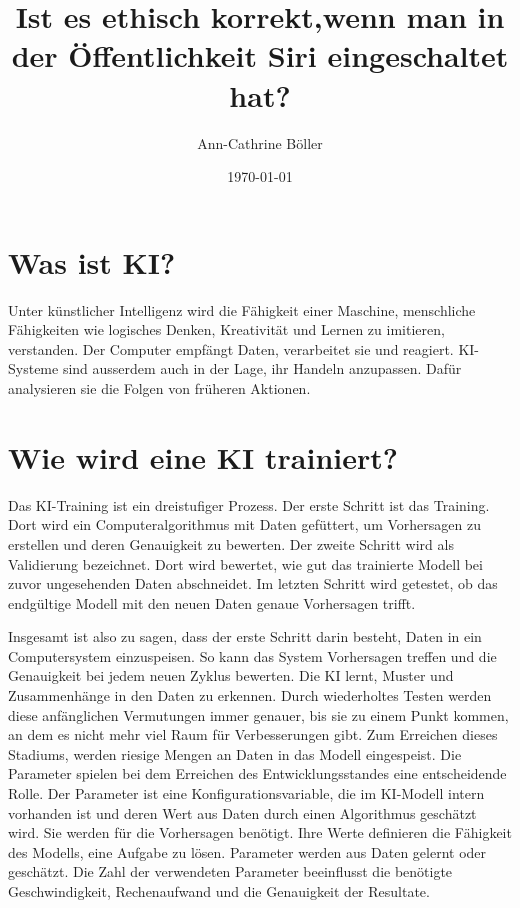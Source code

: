 \documentclass{article}
\title{Ist es ethisch korrekt,wenn man in der Öffentlichkeit Siri eingeschaltet hat?}
\author{Ann-Cathrine Böller}
\date{\today}
\begin{document}
\maketitle


     

\tableofcontents

\section{Was ist KI?}
Unter künstlicher Intelligenz wird die Fähigkeit einer Maschine, menschliche Fähigkeiten wie logisches Denken, Kreativität und Lernen zu imitieren, verstanden.
Der Computer empfängt Daten, verarbeitet sie und reagiert. KI-Systeme sind ausserdem auch in der Lage, ihr Handeln anzupassen. Dafür analysieren sie die Folgen von früheren Aktionen.

\section{Wie wird eine KI trainiert?}
Das KI-Training ist ein dreistufiger Prozess. Der erste Schritt ist das Training. Dort wird ein Computeralgorithmus mit Daten gefüttert, um Vorhersagen zu erstellen und deren Genauigkeit zu bewerten. Der zweite Schritt wird als Validierung bezeichnet. Dort wird bewertet, wie gut das trainierte Modell bei zuvor ungesehenden Daten abschneidet. Im letzten Schritt wird getestet, ob das endgültige Modell mit den neuen Daten genaue Vorhersagen trifft.

Insgesamt ist also zu sagen, dass der erste Schritt darin besteht, Daten in ein Computersystem einzuspeisen. So kann das System Vorhersagen treffen und die Genauigkeit bei jedem neuen Zyklus bewerten. Die KI lernt, Muster und Zusammenhänge in den Daten zu erkennen. Durch wiederholtes Testen werden diese anfänglichen Vermutungen immer genauer, bis sie zu einem Punkt kommen, an dem es nicht mehr viel Raum für Verbesserungen gibt. Zum Erreichen dieses Stadiums, werden riesige Mengen an Daten in das Modell eingespeist. Die Parameter spielen bei dem Erreichen des Entwicklungsstandes eine entscheidende Rolle. Der Parameter ist eine Konfigurationsvariable, die im KI-Modell intern vorhanden ist und deren Wert aus Daten durch einen Algorithmus geschätzt wird. Sie werden für die Vorhersagen benötigt. Ihre Werte definieren die Fähigkeit des Modells, eine Aufgabe zu lösen. Parameter werden aus Daten gelernt oder geschätzt. Die Zahl der verwendeten Parameter beeinflusst die benötigte Geschwindigkeit, Rechenaufwand und die Genauigkeit der Resultate. 
\end{document}
